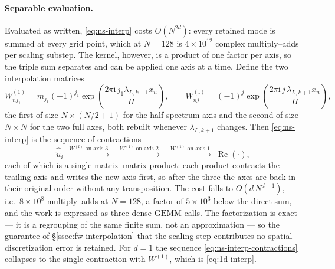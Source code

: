 \documentclass{article}
\begin{document}
\paragraph{Separable evaluation.}
Evaluated as written, \eqref{eq:ns-interp} costs $O(N^{2d})$: every retained
mode is summed at every grid point, which at $N = 128$ is $4 \times 10^{12}$
complex multiply--adds per scaling substep. The kernel, however, is a product
of one factor per axis, so the triple sum separates and can be applied one
axis at a time. Define the two interpolation matrices
\begin{equation}\label{eq:ns-interp-matrices}
  W^{(1)}_{n j_1} = m_{j_1} (-1)^{j_1}
    \exp\!\left( \frac{2\pi \mathrm{i}\, j_1 \lambda_{L,k+1} x_n}{H} \right),
  \qquad
  W^{(\mathrm{f})}_{n j} = (-1)^{j}
    \exp\!\left( \frac{2\pi \mathrm{i}\, j\, \lambda_{L,k+1} x_n}{H} \right),
\end{equation}
the first of size $N \times (N/2 + 1)$ for the half-spectrum axis and the
second of size $N \times N$ for the two full axes, both rebuilt whenever
$\lambda_{L,k+1}$ changes. Then \eqref{eq:ns-interp} is the sequence of
contractions
\begin{equation}\label{eq:ns-interp-contractions}
  \hat{\tilde u}_i \;\xrightarrow{\ W^{(\mathrm{f})} \text{ on axis } 3\ }\;
  \;\xrightarrow{\ W^{(\mathrm{f})} \text{ on axis } 2\ }\;
  \;\xrightarrow{\ W^{(1)} \text{ on axis } 1\ }\;
  \operatorname{Re}(\cdot),
\end{equation}
each of which is a single matrix--matrix product: each product contracts the
trailing axis and writes the new axis first, so after the three the axes are
back in their original order without any transposition. The cost falls to $O(d\, N^{d+1})$, i.e.\ $8 \times 10^{8}$
multiply--adds at $N = 128$, a factor of $5 \times 10^{3}$ below the direct
sum, and the work is expressed as three dense $\mathrm{GEMM}$ calls. The
factorization is exact --- it is a regrouping of the same finite sum, not an
approximation --- so the guarantee of \S\ref{ssec:fw-interpolation} that the
scaling step contributes no spatial discretization error is retained. For
$d = 1$ the sequence \eqref{eq:ns-interp-contractions} collapses to the single
contraction with $W^{(1)}$, which is \eqref{eq:1d-interp}.
\end{document}
